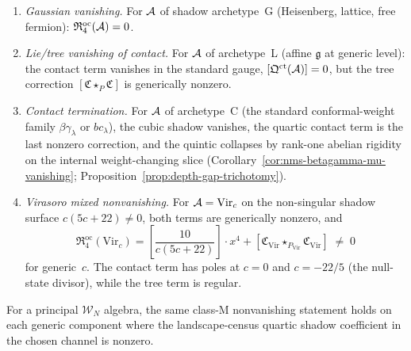 \begin{theorem}
\label{thm:thqg-oc-quartic-vanishing}
\begin{enumerate}[label=\textup{(\roman*)}]
\item \emph{Gaussian vanishing.}
 For $\mathcal{A}$ of shadow archetype~G (Heisenberg, lattice, free fermion):
 $\mathfrak{R}^{\mathrm{oc}}_4(\mathcal{A}) = 0$.

\item \emph{Lie/tree vanishing of contact.}
 For $\mathcal{A}$ of archetype~L (affine $\widehat{\mathfrak{g}}$ at
 generic level): the contact term vanishes in the standard gauge,
 $[\mathfrak{Q}^{\mathrm{ct}}(\mathcal{A})] = 0$, but the tree correction
 $[\mathfrak{C} \star_P \mathfrak{C}]$ is generically nonzero.

\item \emph{Contact termination.}
 For $\mathcal{A}$ of archetype~C
 \textup{(}the standard conformal-weight family
 $\beta\gamma_\lambda$ or $bc_\lambda$\textup{)}, the cubic shadow
 vanishes, the quartic contact term is the last nonzero correction,
 and the quintic collapses by rank-one abelian rigidity on the
 internal weight-changing slice
 \textup{(}Corollary~\ref{cor:nms-betagamma-mu-vanishing};
 Proposition~\ref{prop:depth-gap-trichotomy}\textup{)}.

\item \emph{Virasoro mixed nonvanishing.}
 For $\mathcal{A}=\mathrm{Vir}_c$ on the non-singular shadow surface
 $c(5c+22)\ne0$, both terms are generically nonzero, and
 \begin{equation}\label{eq:thqg-oc-quartic-virasoro}
 \mathfrak{R}^{\mathrm{oc}}_{4}(\mathrm{Vir}_c)
 =
 \left[\frac{10}{c(5c + 22)}\right] \cdot x^4
 + [\mathfrak{C}_{\mathrm{Vir}} \star_{P_{\mathrm{Vir}}}
 \mathfrak{C}_{\mathrm{Vir}}]
 \;\neq\; 0
 \end{equation}
 for generic~$c$. The contact term has poles at $c = 0$ and
 $c = -22/5$ (the null-state divisor), while the tree term is
 regular.
\end{enumerate}
For a principal $\mathcal{W}_N$ algebra, the same class-M
nonvanishing statement holds on each generic component where the
landscape-census quartic shadow coefficient in the chosen channel is
nonzero.
\end{theorem}

